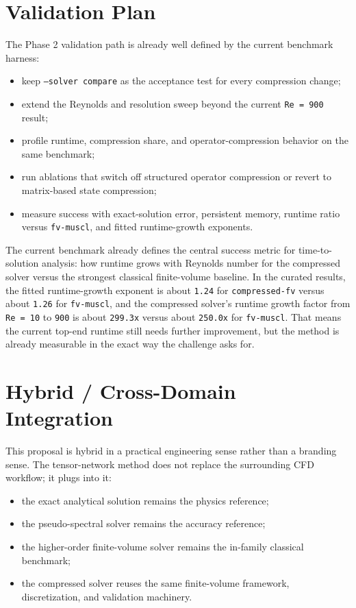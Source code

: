 \documentclass[11pt,a4paper]{article}
\begin{document}
\section{Validation Plan}

The Phase 2 validation path is already well defined by the current benchmark harness:

\begin{itemize}
\item keep \texttt{--solver compare} as the acceptance test for every compression change;
\item extend the Reynolds and resolution sweep beyond the current \texttt{Re = 900} result;
\item profile runtime, compression share, and operator-compression behavior on the same benchmark;
\item run ablations that switch off structured operator compression or revert to matrix-based state compression;
\item measure success with exact-solution error, persistent memory, runtime ratio versus \texttt{fv-muscl}, and fitted runtime-growth exponents.
\end{itemize}

The current benchmark already defines the central success metric for time-to-solution analysis: how runtime grows with Reynolds number for the compressed solver versus the strongest classical finite-volume baseline. In the curated results, the fitted runtime-growth exponent is about \texttt{1.24} for \texttt{compressed-fv} versus about \texttt{1.26} for \texttt{fv-muscl}, and the compressed solver's runtime growth factor from \texttt{Re = 10} to \texttt{900} is about \texttt{299.3x} versus about \texttt{250.0x} for \texttt{fv-muscl}. That means the current top-end runtime still needs further improvement, but the method is already measurable in the exact way the challenge asks for.

\section{Hybrid / Cross-Domain Integration}

This proposal is hybrid in a practical engineering sense rather than a branding sense. The tensor-network method does not replace the surrounding CFD workflow; it plugs into it:

\begin{itemize}
\item the exact analytical solution remains the physics reference;
\item the pseudo-spectral solver remains the accuracy reference;
\item the higher-order finite-volume solver remains the in-family classical benchmark;
\item the compressed solver reuses the same finite-volume framework, discretization, and validation machinery.
\end{itemize}
\end{document}
